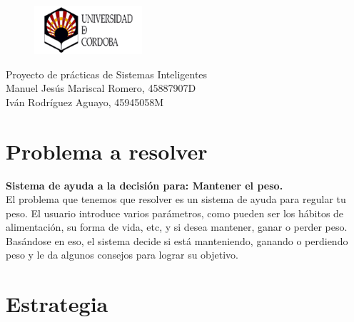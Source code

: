 \documentclass[14pt]{extarticle}
\begin{document}
\begin{titlepage}

	\begin{figure}[htb]
		\includegraphics[width = 4cm]{images/logo_uco.png}
	\end{figure}

	\begin{center}
		\vspace{4cm}
		\LARGE{Proyecto de prácticas de Sistemas Inteligentes} \\
		\vspace{1cm}
		\large{Manuel Jesús Mariscal Romero, 45887907D\\
			Iván Rodríguez Aguayo, 45945058M}
	\end{center}
\end{titlepage}

\newpage
\tableofcontents
\newpage

\section{Problema a resolver}
\textbf{Sistema de ayuda a la decisión para: Mantener el peso.}
\vspace{4pt} \\
El problema que tenemos que resolver es un sistema de ayuda para regular tu peso. El usuario introduce varios parámetros, como
pueden ser los hábitos de alimentación, su forma de vida, etc, y si desea mantener, ganar o perder peso. \\ Basándose en eso, el sistema
decide si está manteniendo, ganando o perdiendo peso y le da algunos consejos para lograr su objetivo.
\section{Estrategia}



\end{document}
